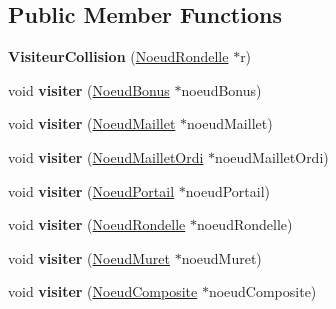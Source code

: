 \subsection*{Public Member Functions}
\begin{DoxyCompactItemize}
\item 
{\bfseries Visiteur\+Collision} (\hyperlink{class_noeud_rondelle}{Noeud\+Rondelle} $\ast$r)\hypertarget{class_visiteur_collision_aacbfc885d4c00d871364ba7e746b2d28}{}\label{class_visiteur_collision_aacbfc885d4c00d871364ba7e746b2d28}

\item 
void {\bfseries visiter} (\hyperlink{class_noeud_bonus}{Noeud\+Bonus} $\ast$noeud\+Bonus)\hypertarget{class_visiteur_collision_a7f4bceacc60580ac588bd046c417f7a6}{}\label{class_visiteur_collision_a7f4bceacc60580ac588bd046c417f7a6}

\item 
void {\bfseries visiter} (\hyperlink{class_noeud_maillet}{Noeud\+Maillet} $\ast$noeud\+Maillet)\hypertarget{class_visiteur_collision_a7eb692a49a93d578c0f8873d3271cc17}{}\label{class_visiteur_collision_a7eb692a49a93d578c0f8873d3271cc17}

\item 
void {\bfseries visiter} (\hyperlink{class_noeud_maillet_ordi}{Noeud\+Maillet\+Ordi} $\ast$noeud\+Maillet\+Ordi)\hypertarget{class_visiteur_collision_a35c03cab2faca54406e6b0c082185e21}{}\label{class_visiteur_collision_a35c03cab2faca54406e6b0c082185e21}

\item 
void {\bfseries visiter} (\hyperlink{class_noeud_portail}{Noeud\+Portail} $\ast$noeud\+Portail)\hypertarget{class_visiteur_collision_a0f7c0b23f595f166ecfffb8022b0dad3}{}\label{class_visiteur_collision_a0f7c0b23f595f166ecfffb8022b0dad3}

\item 
void {\bfseries visiter} (\hyperlink{class_noeud_rondelle}{Noeud\+Rondelle} $\ast$noeud\+Rondelle)\hypertarget{class_visiteur_collision_a3996b0f30ac654025e14d01b9718fb18}{}\label{class_visiteur_collision_a3996b0f30ac654025e14d01b9718fb18}

\item 
void {\bfseries visiter} (\hyperlink{class_noeud_muret}{Noeud\+Muret} $\ast$noeud\+Muret)\hypertarget{class_visiteur_collision_ae213b27680fe09c204222a1da36955c2}{}\label{class_visiteur_collision_ae213b27680fe09c204222a1da36955c2}

\item 
void {\bfseries visiter} (\hyperlink{class_noeud_composite}{Noeud\+Composite} $\ast$noeud\+Composite)\hypertarget{class_visiteur_collision_a67eae79fa7c1760ebb8b95ba64cd73e1}{}\label{class_visiteur_collision_a67eae79fa7c1760ebb8b95ba64cd73e1}


\end{DoxyCompactItemize}
